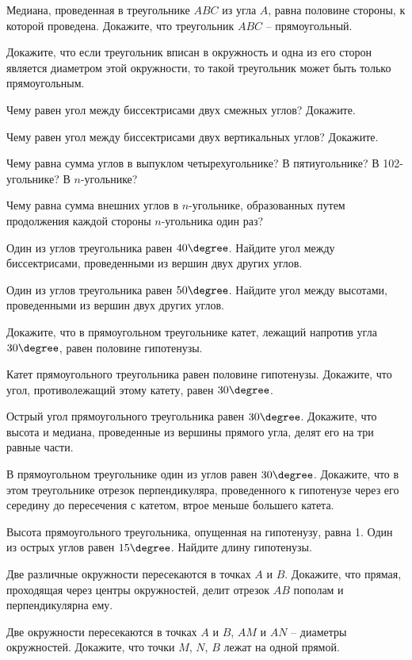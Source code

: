 \begin{enumcols}[label=\textbf{\arabic*.}]
	\item {}
	\item Медиана, проведенная в треугольнике \( ABC \) из угла \( A \), равна половине стороны, к которой проведена. Докажите, что треугольник \( ABC \) -- прямоугольный.
	\item Докажите, что если треугольник вписан в окружность и одна из его сторон является диаметром этой окружности, то такой треугольник может быть только прямоугольным.
	\item Чему равен угол между биссектрисами двух смежных углов? Докажите.
	\item Чему равен угол между биссектрисами двух вертикальных углов? Докажите.
	\item Чему равна сумма углов в выпуклом четырехугольнике? В пятиугольнике? В 102-угольнике? В \( n \)-угольнике?
	\item Чему равна сумма внешних углов в \( n \)-угольнике, образованных путем продолжения каждой стороны \( n \)-угольника один раз?
	\item {}
	\item Один из углов треугольника равен \( 40\degree \). Найдите угол между биссектрисами, проведенными из вершин двух других углов.
	\item Один из углов треугольника равен \( 50\degree \). Найдите угол между высотами, проведенными из вершин двух других углов.
	\item Докажите, что в прямоугольном треугольнике катет, лежащий напротив угла \( 30\degree \), равен половине гипотенузы.
	\item Катет прямоугольного треугольника равен половине гипотенузы. Докажите, что угол, противолежащий этому катету, равен \( 30\degree \).
	\item Острый угол прямоугольного треугольника равен \( 30\degree \). Докажите, что высота и медиана, проведенные из вершины прямого угла, делят его на три равные части.
	\item В прямоугольном треугольнике один из углов равен \( 30\degree \). Докажите, что в этом треугольнике отрезок перпендикуляра, проведенного к гипотенузе через его середину до пересечения с катетом, втрое меньше большего катета.
	\item Высота прямоугольного треугольника, опущенная на гипотенузу, равна 1. Один из острых углов равен \( 15\degree \). Найдите длину гипотенузы.
	\item Две различные окружности пересекаются в точках \( A \) и  \( B \). Докажите, что прямая, проходящая через центры окружностей, делит отрезок \( AB \) пополам и перпендикулярна ему.
	\item Две окружности пересекаются в точках \( A \) и \( B \), \( AM \) и \( AN \) -- диаметры окружностей. Докажите, что точки \( M \), \( N \), \( B \) лежат на одной прямой.
\end{enumcols}